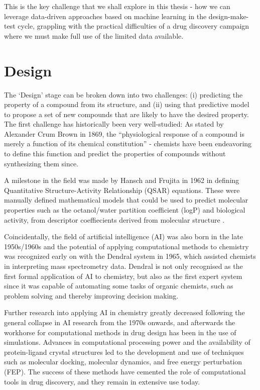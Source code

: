 This is the key challenge that we shall explore in this thesis - how we can leverage data-driven approaches based on machine learning in the design-make-test cycle, grappling with the practical difficulties of a drug discovery campaign where we must make full use of the limited data available.

\section*{Design}

The `Design' stage can be broken down into two challenges: (i) predicting the property of a compound from its structure, and (ii) using that predictive model to propose a set of new compounds that are likely to have the desired property. The first challenge has historically been very well-studied: As stated by Alexander Crum Brown in 1869, the ``physiological response of a compound is merely a function of its chemical constitution'' - chemists have been endeavoring to define this function and predict the properties of compounds without synthesizing them since.

A milestone in the field was made by Hansch and Frujita in 1962 in defining Quantitative Structure-Activity Relationship (QSAR) equations. These were manually defined mathematical models that could be used to predict molecular properties such as the octanol/water partition coefficient (logP) and biological activity, from descriptor coeffiecients derived from molecular structure \cite{hansch1962correlation, hansch1964p}.

Coincidentally, the field of artificial intelligence (AI) was also born in the late 1950s/1960s and the potential of applying computational methods to chemistry was recognized early on with the Dendral system in 1965, which assisted chemists in interpreting mass spectrometry data. Dendral is not only recognised as the first formal application of AI to chemistry, but also as the first expert system since it was capable of automating some tasks of organic chemists, such as problem solving and thereby improving decision making.

Further research into applying AI in chemistry greatly decreased following the general collapse in AI research from the 1970s onwards, and afterwards the workhorse for computational methods in drug design has been in the use of simulations. Advances in computational processing power and the availability of protein-ligand crystal structures led to the development and use of techniques such as molecular docking, molecular dynamics, and free energy perturbation (FEP). The success of these methods have cemented the role of computational tools in drug discovery, and they remain in extensive use today.

